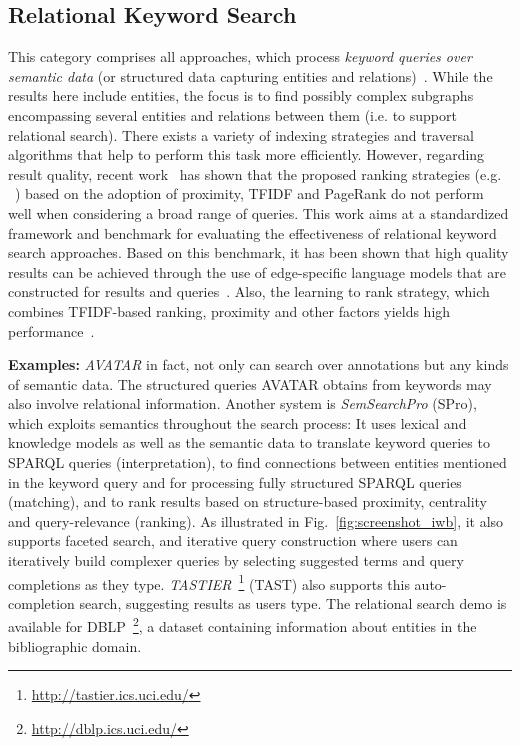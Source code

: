 \subsection{Relational Keyword Search}
This category comprises all approaches, which process \emph{keyword queries over semantic data} (or structured data capturing entities and relations)~\cite{DBLP:conf/icde/TranWRC09,DBLP:conf/cikm/LadwigT11,DBLP:conf/sigmod/LiOFWZ08}. While the results here include entities, the focus is to find possibly complex subgraphs encompassing several entities and relations between them (i.e. to support relational search). There exists a variety of indexing strategies and traversal algorithms that help to perform this task more efficiently. However, regarding result quality, recent work~\cite{DBLP:conf/cikm/CoffmanW10} has shown that the proposed ranking strategies (e.g. ~\cite{DBLP:conf/icde/TranWRC09,DBLP:conf/sigmod/LiuYMC06}) based on the adoption of proximity, TFIDF and PageRank do not perform well when considering a broad range of queries. This work aims at a standardized framework and benchmark for evaluating the effectiveness of relational keyword search approaches. Based on this benchmark, it has been shown that high quality results can be achieved through the use of edge-specific language models that are constructed for results and queries~\cite{DBLP:conf/cikm/BicerTN11}. Also, the learning to rank strategy, which combines TFIDF-based ranking, proximity and other factors yields high performance~\cite{DBLP:conf/cikm/CoffmanW11}. 

\textbf{Examples:} \emph{AVATAR} in fact, not only can search over annotations but any kinds of semantic data. The structured queries AVATAR obtains from keywords may also involve relational information. Another system is \emph{SemSearchPro} (SPro), which exploits semantics throughout the search process: It uses lexical and knowledge models as well as the semantic data to translate keyword queries to SPARQL queries (interpretation), to find connections between entities mentioned in the keyword query and for processing fully structured SPARQL queries (matching), and to rank results based on structure-based proximity, centrality and query-relevance (ranking). As illustrated in Fig.~\ref{fig:screenshot_iwb}, it also supports faceted search, and iterative query construction where users can iteratively build complexer queries by selecting suggested terms and query completions as they type. \emph{TASTIER}~\footnote{\url{http://tastier.ics.uci.edu/}} (TAST) also supports this auto-completion search, suggesting results as users type. The relational search demo is available for DBLP~\footnote{\url{http://dblp.ics.uci.edu/}}, a dataset containing information about entities in the bibliographic domain. 


